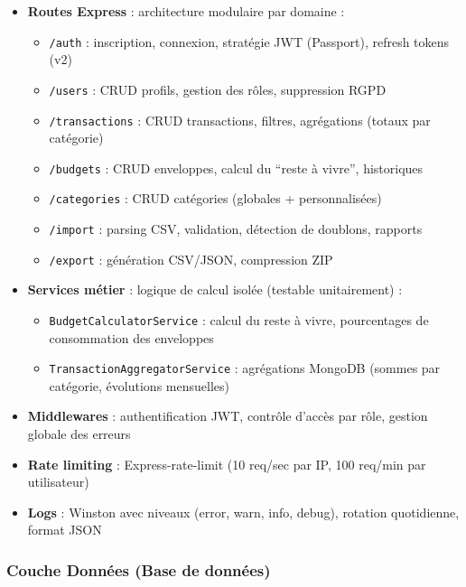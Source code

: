 \begin{itemize}
  \item \textbf{Routes Express} : architecture modulaire par domaine :
    \begin{itemize}
      \item \texttt{/auth} : inscription, connexion, stratégie JWT (Passport), refresh tokens (v2)
      \item \texttt{/users} : CRUD profils, gestion des rôles, suppression RGPD
      \item \texttt{/transactions} : CRUD transactions, filtres, agrégations (totaux par catégorie)
      \item \texttt{/budgets} : CRUD enveloppes, calcul du ``reste à vivre'', historiques
      \item \texttt{/categories} : CRUD catégories (globales + personnalisées)
      \item \texttt{/import} : parsing CSV, validation, détection de doublons, rapports
      \item \texttt{/export} : génération CSV/JSON, compression ZIP
    \end{itemize}
  \item \textbf{Services métier} : logique de calcul isolée (testable unitairement) :
    \begin{itemize}
      \item \texttt{BudgetCalculatorService} : calcul du reste à vivre, pourcentages de consommation des enveloppes
      \item \texttt{TransactionAggregatorService} : agrégations MongoDB (sommes par catégorie, évolutions mensuelles)
    \end{itemize}
  \item \textbf{Middlewares} : authentification JWT, contrôle d'accès par rôle, gestion globale des erreurs
  \item \textbf{Rate limiting} : Express-rate-limit (10 req/sec par IP, 100 req/min par utilisateur)
  \item \textbf{Logs} : Winston avec niveaux (error, warn, info, debug), rotation quotidienne, format JSON
\end{itemize}

\subsubsection{Couche Données (Base de données)}

